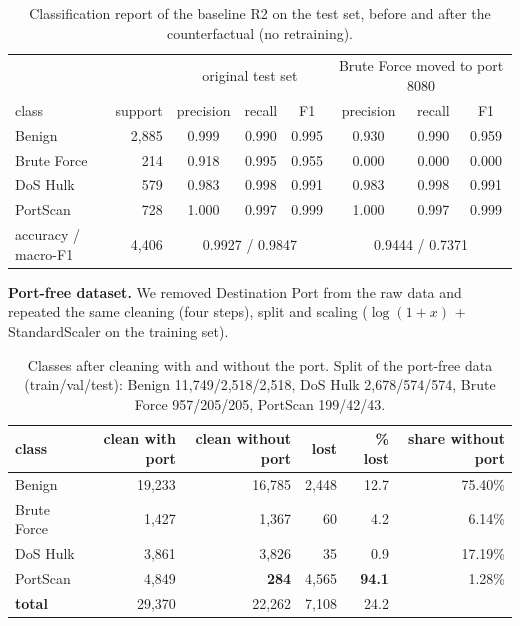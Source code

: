 \documentclass[9pt]{extarticle}
\newcommand{\run}[1]{\textsf{#1}}
\begin{document}
\begin{table}[h]
\centering\small
\begin{tabular}{lrcccccc}
\toprule
 & & \multicolumn{3}{c}{original test set} & \multicolumn{3}{c}{Brute Force moved to port 8080} \\
class & support & precision & recall & F1 & precision & recall & F1 \\
\midrule
Benign & 2,885 & 0.999 & 0.990 & 0.995 & 0.930 & 0.990 & 0.959 \\
Brute Force & 214 & 0.918 & 0.995 & 0.955 & 0.000 & 0.000 & 0.000 \\
DoS Hulk & 579 & 0.983 & 0.998 & 0.991 & 0.983 & 0.998 & 0.991 \\
PortScan & 728 & 1.000 & 0.997 & 0.999 & 1.000 & 0.997 & 0.999 \\
\midrule
accuracy / macro-F1 & 4,406 & \multicolumn{3}{c}{0.9927 / 0.9847} & \multicolumn{3}{c}{0.9444 / 0.7371} \\
\bottomrule
\end{tabular}
\caption{Classification report of the baseline \run{R2} on the test set, before and after the counterfactual (no retraining).}
\label{tab:cf}
\end{table}

\textbf{Port-free dataset.} We removed Destination Port from the raw data and repeated the same cleaning (four steps), split and scaling ($\log(1+x)$ + StandardScaler on the training set).

\begin{table}[h]
\centering\small
\begin{tabular}{lrrrrr}
\toprule
class & clean with port & clean without port & lost & \% lost & share without port \\
\midrule
Benign & 19,233 & 16,785 & 2,448 & 12.7 & 75.40\% \\
Brute Force & 1,427 & 1,367 & 60 & 4.2 & 6.14\% \\
DoS Hulk & 3,861 & 3,826 & 35 & 0.9 & 17.19\% \\
PortScan & 4,849 & \textbf{284} & 4,565 & \textbf{94.1} & 1.28\% \\
\textbf{total} & 29,370 & 22,262 & 7,108 & 24.2 & \\
\bottomrule
\end{tabular}
\caption{Classes after cleaning with and without the port. Split of the port-free data (train/val/test): Benign 11,749/2,518/2,518, DoS Hulk 2,678/574/574, Brute Force 957/205/205, PortScan 199/42/43.}
\label{tab:pf}
\end{table}
\end{document}
